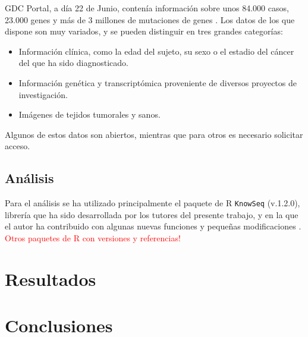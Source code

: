 GDC Portal, a día 22 de Junio, contenía información sobre unos 84.000 casos, 23.000 genes y más de 3 millones de mutaciones de genes \cite{GDCPortal}. Los datos de los que dispone son muy variados, y se pueden distinguir en tres grandes categorías:

\begin{itemize}
	\item Información clínica, como la edad del sujeto, su sexo o el estadio del cáncer del que ha sido diagnosticado.
	\item Información genética y transcriptómica proveniente de diversos proyectos de investigación.
	\item Imágenes de tejidos tumorales y sanos.
\end{itemize} 

Algunos de estos datos son abiertos, mientras que para otros es necesario solicitar acceso.

\subsection{Análisis}

Para el análisis se ha utilizado principalmente el paquete de R \texttt{KnowSeq} (v.1.2.0), librería que ha sido desarrollada por los tutores del presente trabajo, y en la que el autor ha contribuido con algunas nuevas funciones y pequeñas modificaciones \cite{KnowSeq}.\\

\textcolor{red}{Otros paquetes de R con versiones y referencias!}

\section{Resultados}

\section{Conclusiones}

